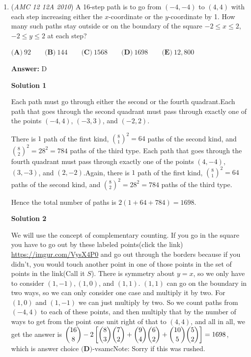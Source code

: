 \begin{enumerate}
 


	\item (\textit{AMC 12 12A 2010}) A 16-step path is to go from $(-4,-4)$ to $(4,4)$ with each step increasing either the $x$-coordinate or the $y$-coordinate by 1. How many such paths stay outside or on the boundary of the square $-2 \le x \le 2$, $-2 \le y \le 2$ at each step?


 $\textbf{(A)}\ 92 \qquad \textbf{(B)}\ 144 \qquad \textbf{(C)}\ 1568 \qquad \textbf{(D)}\ 1698 \qquad \textbf{(E)}\ 12,800$

 \textbf{Answer: }D



\textbf{Solution 1}

Each path must go through either the second or the fourth quadrant.Each path that goes through the second quadrant must pass through exactly one of the points $(-4,4)$, $(-3,3)$, and $(-2,2)$.

 There is $1$ path of the first kind, ${8\choose 1}^2=64$ paths of the second kind, and ${8\choose 2}^2=28^2=784$ paths of the third type. Each path that goes through the fourth quadrant must pass through exactly one of the points $(4,-4)$, $(3,-3)$, and $(2,-2)$.Again, there is $1$ path of the first kind, ${8\choose 1}^2=64$ paths of the second kind, and ${8\choose 2}^2=28^2=784$ paths of the third type. 

 Hence the total number of paths is $2(1+64+784) = \boxed{1698}$.

 



\textbf{Solution 2}

We will use the concept of complementary counting. If you go in the square you have to go out by these labeled points(click the link) \href{https://imgur.com/VysX4P0}{https://imgur.com/VysX4P0} and go out through the borders because if you didn't, you would touch another point in one of those points in the set of points in the link(Call it $S$). There is symmetry about $y=x$, so we only have to consider $(1,-1), (1,0)$, and $(1,1)$. $(1,1)$ can go on the boundary in two ways, so we can only consider one case and multiply it by two. For $(1,0)$ and $(1,-1)$ we can just multiply by two. So we count paths from $(-4,4)$ to each of these points, and then multiply that by the number of ways to get from the point one unit right of that to $(4,4)$, and all in all, we get the answer is $\dbinom{16}{8}-2\left[\dbinom{8}{3}\dbinom{7}{2}+\dbinom{9}{4}\dbinom{6}{2}+\dbinom{10}{5}\dbinom{5}{2}\right]=1698$, which is answer choice $\textbf{(D)}$-vsamcNote: Sorry if this was rushed.


\end{enumerate}
